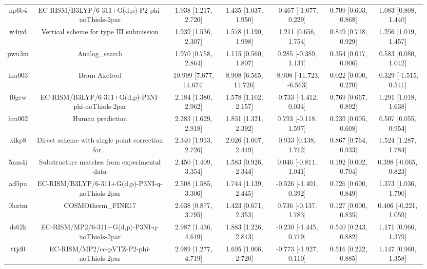 \documentclass{article}
\begin{document}
\begin{center}
\begin{longtable}{|ccccccc|}
 np6b4 &    EC-RISM/B3LYP/6-311+G(d,p)-P2-phi-noThiols-2par &    1.938 [1.217, 2.720] &   1.435 [1.037, 1.950] &    -0.467 [-1.077, 0.229] &  0.709 [0.603, 0.868] &    1.083 [0.808, 1.440] \\
 w4iyd &            Vertical scheme for type III submission &    1.939 [1.536, 2.307] &   1.578 [1.190, 1.998] &      1.211 [0.656, 1.754] &  0.849 [0.718, 0.929] &    1.256 [1.019, 1.457] \\
 pwn3m &                                     Analog\_search &    1.970 [0.758, 2.864] &   1.115 [0.560, 1.807] &     0.285 [-0.389, 1.131] &  0.354 [0.017, 0.906] &    0.583 [0.080, 1.042] \\
 hm003 &                                       Bram Axelrod &  10.999 [7.677, 14.674] &  8.908 [6.565, 11.726] &  -8.908 [-11.723, -6.563] &  0.022 [0.000, 0.270] &  -0.329 [-1.515, 0.541] \\
 f0gew &  EC-RISM/B3LYP/6-311+G(d,p)-P3NI-phi-noThiols-2par &    2.184 [1.380, 2.962] &   1.578 [1.102, 2.157] &    -0.733 [-1.412, 0.034] &  0.769 [0.667, 0.892] &    1.291 [1.018, 1.638] \\
 hm002 &                                   Human prediction &    2.283 [1.629, 2.918] &   1.831 [1.321, 2.392] &     0.793 [-0.118, 1.597] &  0.239 [0.005, 0.608] &    0.507 [0.055, 0.954] \\
 xikp8 &  Direct scheme with single point correction for... &    2.340 [1.913, 2.726] &   2.026 [1.607, 2.449] &      0.933 [0.138, 1.712] &  0.867 [0.764, 0.933] &    1.524 [1.287, 1.784] \\
 5nm4j &        Substructure matches from experimental data &    2.450 [1.409, 3.354] &   1.583 [0.926, 2.344] &     0.046 [-0.811, 1.041] &  0.192 [0.002, 0.704] &   0.398 [-0.065, 0.823] \\
 ad5pu &    EC-RISM/B3LYP/6-311+G(d,p)-P3NI-q-noThiols-2par &    2.508 [1.585, 3.306] &   1.744 [1.139, 2.445] &    -0.526 [-1.401, 0.392] &  0.726 [0.600, 0.849] &    1.373 [1.036, 1.790] \\
 0hxtm &                                 COSMOtherm\_FINE17 &    2.638 [0.877, 3.795] &   1.423 [0.671, 2.353] &     0.736 [-0.137, 1.783] &  0.127 [0.000, 0.835] &   0.406 [-0.221, 1.059] \\
 ds62k &      EC-RISM/MP2/6-311+G(d,p)-P3NI-q-noThiols-2par &    2.987 [1.436, 4.619] &   1.883 [1.226, 2.843] &    -0.230 [-1.445, 0.719] &  0.540 [0.243, 0.882] &    1.171 [0.966, 1.379] \\
 ttjd0 &           EC-RISM/MP2/cc-pVTZ-P2-phi-noThiols-2par &    2.989 [1.277, 4.719] &   1.695 [1.006, 2.720] &    -0.773 [-1.927, 0.110] &  0.516 [0.222, 0.885] &    1.147 [0.960, 1.358] \\

\end{longtable}
\end{center}
\end{document}
